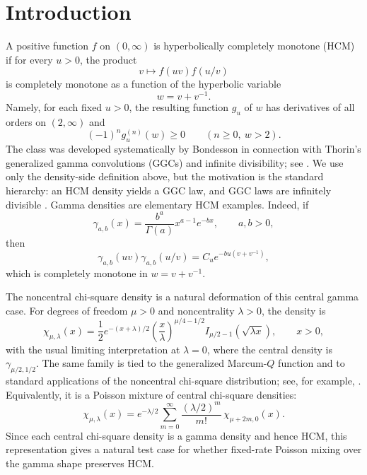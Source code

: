 ﻿\documentclass[preprint,12pt,authoryear]{elsarticle}
\begin{document}
\medskip

\section{Introduction}

A positive function \(f\) on \((0,\infty)\) is hyperbolically completely monotone (HCM) if for every \(u>0\), the product
\begin{equation}
v\longmapsto f(uv)f(u/v)
\end{equation}
is completely monotone as a function of the hyperbolic variable
\begin{equation}
w=v+v^{-1}.
\end{equation}
Namely, for each fixed \(u>0\), the resulting function \(g_u\) of \(w\) has derivatives of all orders on \((2,\infty)\) and
\begin{equation}
(-1)^n g_u^{(n)}(w)\ge0
\qquad(n\ge0,\ w>2).
\end{equation}
The class was developed systematically by Bondesson in connection with Thorin's generalized gamma convolutions (GGCs) and infinite divisibility; see \cite{Thorin1977,Bondesson1981,Bondesson1992}.  We use only the density-side definition above, but the motivation is the standard hierarchy: an HCM density yields a GGC law, and GGC laws are infinitely divisible \cite{Bondesson1992}.  Gamma densities are elementary HCM examples.  Indeed, if
\begin{equation}
\gamma_{a,b}(x)
=
\frac{b^a}{\Gamma(a)}x^{a-1}e^{-bx},
\qquad a,b>0,
\end{equation}
then
\begin{equation}
\gamma_{a,b}(uv)\gamma_{a,b}(u/v)
=
C_u e^{-bu(v+v^{-1})},
\end{equation}
which is completely monotone in \(w=v+v^{-1}\).

The noncentral chi-square density is a natural deformation of this central gamma case.  For degrees of freedom \(\mu>0\) and noncentrality \(\lambda>0\), the density is
\begin{equation}
\chi_{\mu,\lambda}(x)
=
\frac12 e^{-(x+\lambda)/2}
\left(\frac{x}{\lambda}\right)^{\mu/4-1/2}
I_{\mu/2-1}(\sqrt{\lambda x}),
\qquad x>0,
\end{equation}
with the usual limiting interpretation at \(\lambda=0\), where the central density is \(\gamma_{\mu/2,1/2}\).  The same family is tied to the generalized Marcum-\(Q\) function and to standard applications of the noncentral chi-square distribution; see, for example, \cite{BariczJankovMasirevicPogany2021}.  Equivalently, it is a Poisson mixture of central chi-square densities:
\begin{equation}
\chi_{\mu,\lambda}(x)
=
e^{-\lambda/2}
\sum_{m=0}^{\infty}
\frac{(\lambda/2)^m}{m!}\,
\chi_{\mu+2m,0}(x).
\end{equation}
Since each central chi-square density is a gamma density and hence HCM, this representation gives a natural test case for whether fixed-rate Poisson mixing over the gamma shape preserves HCM.
\end{document}
